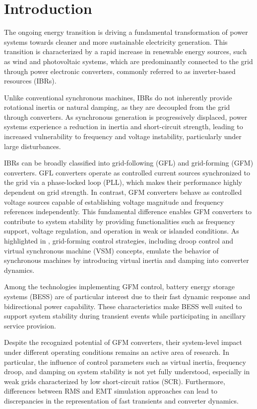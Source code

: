 \chapter{Introduction}
\label{ch:Introduction}



The ongoing energy transition is driving a fundamental transformation of power systems towards cleaner and more sustainable electricity generation. This transition is characterized by a rapid increase in renewable energy sources, such as wind and photovoltaic systems, which are predominantly connected to the grid through power electronic converters, commonly referred to as inverter-based resources (IBRs). 

Unlike conventional synchronous machines, IBRs do not inherently provide rotational inertia or natural damping, as they are decoupled from the grid through converters. As synchronous generation is progressively displaced, power systems experience a reduction in inertia and short-circuit strength, leading to increased vulnerability to frequency and voltage instability, particularly under large disturbances.

IBRs can be broadly classified into grid-following (GFL) and grid-forming (GFM) converters. GFL converters operate as controlled current sources synchronized to the grid via a phase-locked loop (PLL), which makes their performance highly dependent on grid strength. In contrast, GFM converters behave as controlled voltage sources capable of establishing voltage magnitude and frequency references independently. This fundamental difference enables GFM converters to contribute to system stability by providing functionalities such as frequency support, voltage regulation, and operation in weak or islanded conditions. As highlighted in \cite{digsilent2024pfmanual}, grid-forming control strategies, including droop control and virtual synchronous machine (VSM) concepts, emulate the behavior of synchronous machines by introducing virtual inertia and damping into converter dynamics.

Among the technologies implementing GFM control, battery energy storage systems (BESS) are of particular interest due to their fast dynamic response and bidirectional power capability. These characteristics make BESS well suited to support system stability during transient events while participating in ancillary service provision.

Despite the recognized potential of GFM converters, their system-level impact under different operating conditions remains an active area of research. In particular, the influence of control parameters such as virtual inertia, frequency droop, and damping on system stability is not yet fully understood, especially in weak grids characterized by low short-circuit ratios (SCR). Furthermore, differences between RMS and EMT simulation approaches can lead to discrepancies in the representation of fast transients and converter dynamics.

